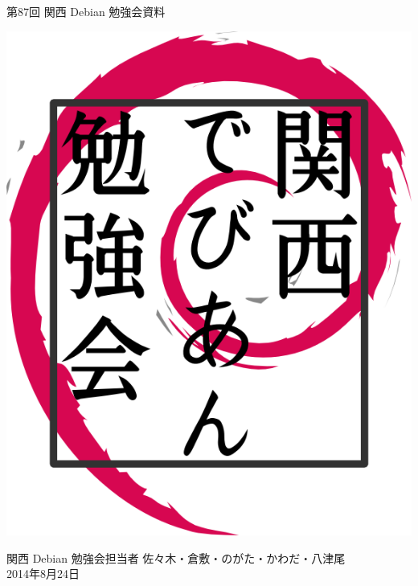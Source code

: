 \documentclass[mingoth,a4paper]{jsarticle}
\newcommand{\debmtgyear}{2014}
\newcommand{\debmtgdate}{24}
\newcommand{\debmtgmonth}{8}
\newcommand{\debmtgnumber}{87}
\begin{document}
\begin{titlepage}


 第\debmtgnumber{}回 関西 Debian 勉強会資料

\vspace{2cm}

\begin{center}
\includegraphics{image200802/kansaidebianlogo.png}
\end{center}

\begin{flushright}
\hfill{}関西 Debian 勉強会担当者 佐々木・倉敷・のがた・かわだ・八津尾 \\
\hfill{}\debmtgyear{}年\debmtgmonth{}月\debmtgdate{}日
\end{flushright}

\thispagestyle{empty}
\end{titlepage}


\vspace{1em}
\end{document}
